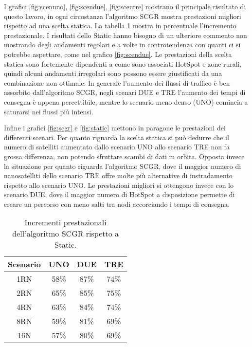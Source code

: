 \documentclass[12pt,a4paper,oneside]{book}
\begin{document}
		I grafici \ref{fig:scenuno}, \ref{fig:scendue}, \ref{fig:scentre} mostrano il principale risultato di questo lavoro, in ogni circostanza l'algoritmo SCGR mostra prestazioni migliori rispetto ad una scelta statica. La tabella \ref{tab:gain} mostra in percentuale l'incremento prestazionale. I risultati dello Static hanno bisogno di un ulteriore commento non mostrando degli andamenti regolari e a volte in controtendenza con quanti ci si potrebbe aspettare, come nel grafico \ref{fig:scendue}. Le prestazioni della scelta statica sono fortemente dipendenti a come sono associati HotSpot e zone rurali, quindi alcuni andamenti irregolari sono possono essere giustificati da una combinazione non ottimale. In generale l'aumento dei flussi di traffico è ben assorbito dall'algoritmo SCGR, negli scenari DUE e TRE l'aumento dei tempi di consegna è appena percettibile, mentre lo scenario meno denso (UNO) comincia a saturarsi nei flussi più intensi.
		
		Infine i grafici \ref{fig:scgr} e \ref{fig:static} mettono in paragone le prestazioni dei differenti scenari. Per quanto riguarda la scelta statica si può dedurre che il numero di satelliti aumentato dallo scenario UNO allo scenario TRE non fa grossa differenza, non potendo sfruttare scambi di dati in orbita. Opposta invece la situazione per quanto riguarda l'algoritmo SCGR, dove il maggior numero di nanosatelliti dello scenario TRE offre molte più alternative di instradamento rispetto allo scenario UNO. Le prestazioni migliori si ottengono invece con lo scenario DUE, dove il maggior numero di HotSpot a disposizione permette di creare un percorso con meno salti tra nodi accorciando i tempi di consegna. 
		
		\begin{table}
			\begin{center}
				\begin{tabular}{| c | c | c | c |}
					\hline
					Scenario & UNO & DUE & TRE \\ \hline
					1RN & 58\% & 87\% & 74\% \\ \hline
					2RN & 65\% & 85\% & 75\% \\ \hline
					4RN & 63\% & 84\% & 74\% \\ \hline
					8RN & 59\% & 81\% & 69\% \\ \hline
					16N & 57\% & 80\% & 69\% \\
					\hline					
				\end{tabular}
				\caption{Incrementi prestazionali dell'algoritmo SCGR rispetto a Static.}
				\label{tab:gain}
			\end{center}			
		\end{table}
		
\end{document}
